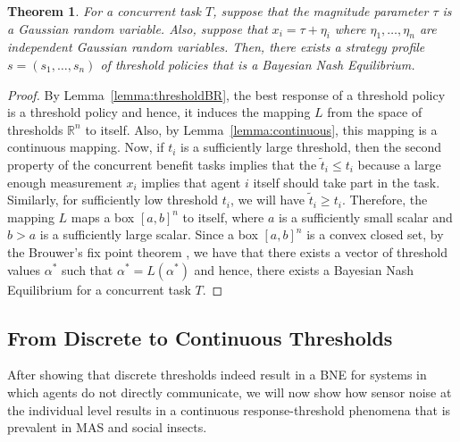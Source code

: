 \documentclass[conference]{ieeeconf}
\newtheorem{theorem}{Theorem}
\def\R{\mathbb{R}}    %
\begin{document}
\begin{theorem}\label{thrm:mainthrm}
For a concurrent task $T$, suppose that the magnitude parameter $\tau$ is a Gaussian random variable. Also, suppose that $x_i=\tau+\eta_i$ where $\eta_1,\ldots,\eta_n$ are independent Gaussian random variables. Then, there exists a strategy profile $s=(s_1,\ldots,s_n)$ of threshold policies that is a Bayesian Nash Equilibrium.
\end{theorem}
\begin{proof}
By Lemma~\ref{lemma:thresholdBR}, the best response of a threshold policy is a threshold policy and hence, it induces the mapping $L$ from the space of thresholds $\R^n$ to itself. Also, by Lemma~\ref{lemma:continuous}, this mapping is a continuous mapping. Now, if $t_i$ is a sufficiently large threshold, then the second property of the concurrent benefit tasks implies that the $\tilde{t}_i\leq t_i$ because a large enough measurement $x_i$ implies that agent $i$ itself should take part in the task. Similarly, for sufficiently low threshold $t_i$, we will have $\tilde{t}_i\geq t_i$. Therefore, the mapping $L$ maps a box $[a,b]^n$ to itself, where $a$ is a sufficiently small scalar and $b>a$ is a sufficiently large scalar. Since a box $[a,b]^n$ is a convex closed set, by the Brouwer's fix point theorem \cite{border1990fixed}, we have that there exists a vector of threshold values $\alpha^*$ such that $\alpha^*=L(\alpha^*)$ and hence, there exists a Bayesian Nash Equilibrium for a concurrent task $T$.
\end{proof}


\subsection{From Discrete to Continuous Thresholds}\label{subsec:sigfun}
After showing that discrete thresholds indeed result in a BNE for systems in which agents do not directly communicate, we will now show how sensor noise at the individual level results in a continuous response-threshold phenomena that is prevalent in MAS and social insects. 
\end{document}
